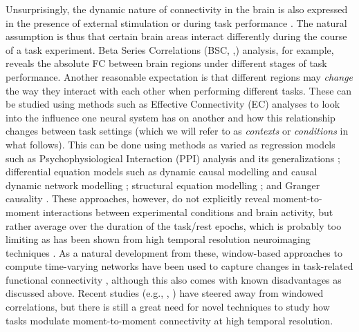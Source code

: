Unsurprisingly, the dynamic nature of connectivity in the brain is also expressed in the presence of external stimulation or during task performance \citep{Gonzalez-Castillo2018}. The natural assumption is thus that certain brain areas interact differently during the course of a task experiment. Beta Series Correlations (BSC, \citeauthor{Rissman2004},\citeyear{Rissman2004}) analysis, for example, reveals the absolute FC between brain regions under different stages of task performance. Another reasonable expectation is that different regions may \textit{change} the way they interact with each other when performing different tasks. These can be studied using methods such as Effective Connectivity (EC) analyses to look into the influence one neural system has on another and how this relationship changes between task settings (which we will refer to as \textit{contexts} or \textit{conditions} in what follows). This can be done using methods as varied as regression models such as Psychophysiological Interaction (PPI) analysis \citep{Friston1997} and its generalizations \citep{McLaren2012}; differential equation models such as dynamic causal modelling \citep{Friston2003} and causal dynamic network modelling \citep{Cao2019};  structural equation modelling \citep{Zhuang2008}; and Granger causality \citep{Wen2013}. These approaches, however, do not explicitly reveal moment-to-moment interactions between experimental conditions and brain activity, but rather average over the duration of the task/rest epochs, which is probably too limiting as has been shown from high temporal resolution neuroimaging techniques \citep{Ploner2009, Zhang2012}. As a natural development from these, window-based approaches to compute time-varying networks have been used to capture changes in task-related functional connectivity \citep{Di2015,Baczkowski2017, Ge2019}, although this also comes with known disadvantages as discussed above. Recent studies (e.g., \citeauthor{Fransson2018}, \citeyear{Fransson2018}) have steered away from windowed correlations, but there is still a great need for novel techniques to study how tasks modulate moment-to-moment connectivity at high temporal resolution.


